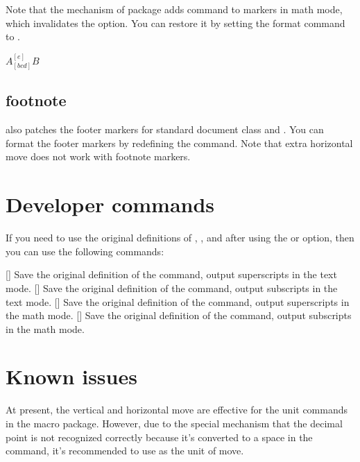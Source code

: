 \documentclass[load-preamble+]{cnltx-doc}
\begin{document}
Note that the mechanism of  package adds  command to markers in math mode, which invalidates the  option. You can restore it by setting the format command to .
\begin{demohigh}
\SetAltSubSupCommands{\relax}
$A_[bcd]^[e]B$
\end{demohigh}

\subsection{footnote}
 also patches the footer markers for standard document class and . You can format the footer markers by redefining the  command. Note that extra horizontal move does not work with footnote markers.

\section{Developer commands}
If you need to use the original definitions of , ,  and  after using the  or  option, then you can use the following commands:
\begin{commands}
  []
  Save the original definition of the  command, output superscripts in the text mode.
  []
  Save the original definition of the  command, output subscripts in the text mode.
  []
  Save the original definition of the  command, output superscripts in the math mode.
  []
  Save the original definition of the  command, output subscripts in the math mode.
\end{commands}

\section{Known issues}
At present, the vertical and horizontal move are effective for the unit commands in the  macro package. However, due to the special mechanism that the decimal point is not recognized correctly because it's converted to a space in the  command, it's recommended to use  as the unit of move.
\end{document}
